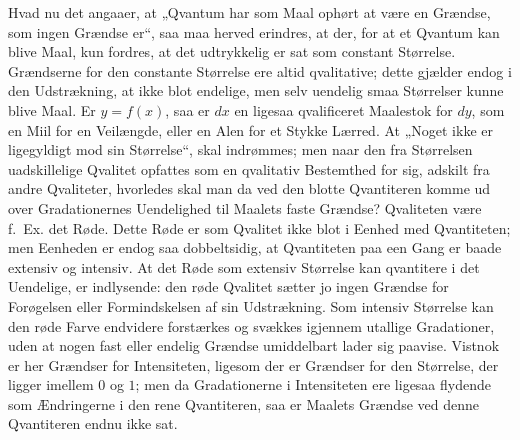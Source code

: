 \documentclass[12pt]{book}
\newcommand{\opage}[1]{\marginnote{\footnotesize\textit{[#1]}}}
\begin{document}
Hvad nu det angaaer, at „Qvantum har som Maal ophørt at være en Grændse, som ingen Grændse er“, saa maa
herved erindres, at der, for at et Qvantum kan blive Maal, kun fordres, at det udtrykkelig er sat som
constant Størrelse. Grændserne for den constante Størrelse ere altid qvalitative; dette gjælder endog i
den Udstrækning, at ikke blot endelige, men selv uendelig smaa Størrelser kunne blive Maal. Er
$y = f(x)$, saa er $dx$ en ligesaa qvalificeret Maalestok for $dy$, som en Miil for en Veilængde, eller
en Alen for et Stykke Lærred. At „Noget ikke er ligegyldigt mod sin Størrelse“, skal indrømmes; men naar
den fra Størrelsen uadskillelige Qvalitet opfattes som en qvalitativ Bestemthed for sig, adskilt fra
andre Qvaliteter, hvorledes skal man da ved den blotte Qvantiteren komme ud over Gradationernes
Uendelighed til Maalets faste Grændse? Qvaliteten være f.\ Ex. det Røde. Dette Røde er som Qvalitet ikke
blot i Eenhed med Qvantiteten; men Eenheden er endog saa dobbeltsidig, at Qvantiteten paa een Gang er
baade extensiv og intensiv. At det Røde som extensiv Størrelse kan qvantitere i det Uendelige, er
indlysende: den røde Qvalitet sætter jo ingen Grændse for Forøgelsen eller Formindskelsen af sin
Udstrækning. Som intensiv Størrelse kan den røde Farve endvidere forstærkes og svækkes igjennem utallige
Gradationer, uden at nogen fast eller endelig Grændse umiddelbart lader sig paavise. Vistnok er her
Grændser for Intensiteten, ligesom der
\opage{319} er Grændser for den Størrelse, der ligger imellem $0$ og $1$; men da Gradationerne i Intensiteten ere
ligesaa flydende som Ændringerne i den rene Qvantiteren, saa er Maalets Grændse ved denne Qvantiteren
endnu ikke sat.
\end{document}
